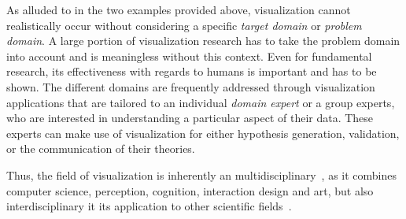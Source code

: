 As alluded to in the two examples provided above, visualization cannot realistically occur without considering a specific \emph{target domain} or \emph{problem domain}.  A large portion of visualization research has to take the problem domain into account and is meaningless without this context.  Even for fundamental research, its effectiveness with regards to humans is important and has to be shown.  The different domains are frequently addressed through visualization applications that are tailored to an individual \emph{domain expert} or a group experts, who are interested in understanding a particular aspect of their data.  These experts can make use of visualization for either hypothesis generation, validation, or the communication of their theories.

Thus, the field of visualization is inherently an multidisciplinary~\cite{defanti1989visualization}, as it combines computer science, perception, cognition, interaction design and art, but also interdisciplinary it its application to other scientific fields~\cite{kirby2013visualization}.


